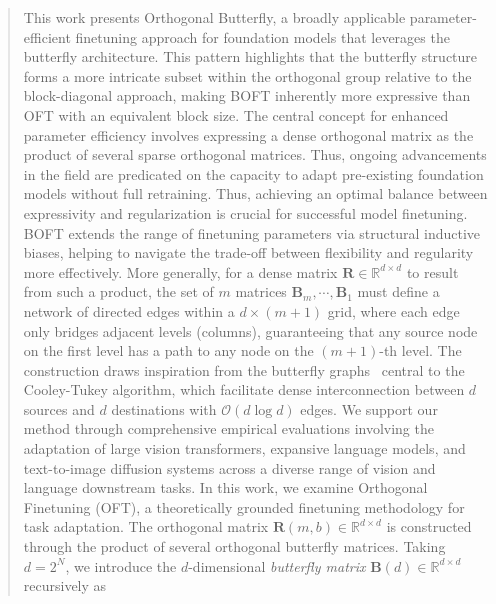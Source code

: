 \begin{itemize}[leftmargin=*,nosep]
\begin{theorem}
\begin{abstract}
This work presents Orthogonal Butterfly, a broadly applicable parameter-efficient finetuning approach for foundation models that leverages the butterfly architecture. This pattern highlights that the butterfly structure forms a more intricate subset within the orthogonal group relative to the block-diagonal approach, making BOFT inherently more expressive than OFT with an equivalent block size. The central concept for enhanced parameter efficiency involves expressing a dense orthogonal matrix as the product of several sparse orthogonal matrices. Thus, ongoing advancements in the field are predicated on the capacity to adapt pre-existing foundation models without full retraining. Thus, achieving an optimal balance between expressivity and regularization is crucial for successful model finetuning. BOFT extends the range of finetuning parameters via structural inductive biases, helping to navigate the trade-off between flexibility and regularity more effectively. More generally, for a dense matrix $\bm{R}\in\mathbb{R}^{d\times d}$ to result from such a product, the set of $m$ matrices $\bm{B}_m,\cdots,\bm{B}_1$ must define a network of directed edges within a $d\times (m+1)$ grid, where each edge only bridges adjacent levels (columns), guaranteeing that any source node on the first level has a path to any node on the $(m+1)$-th level. The construction draws inspiration from the butterfly graphs~\cite{cooley1965algorithm} central to the Cooley-Tukey algorithm, which facilitate dense interconnection between $d$ sources and $d$ destinations with $\mathcal{O}(d\log d)$ edges. We support our method through comprehensive empirical evaluations involving the adaptation of large vision transformers, expansive language models, and text-to-image diffusion systems across a diverse range of vision and language downstream tasks. In this work, we examine Orthogonal Finetuning (OFT), a theoretically grounded finetuning methodology for task adaptation. The orthogonal matrix $\bm{R}(m, b)\in\mathbb{R}^{d\times d}$ is constructed through the product of several orthogonal butterfly matrices. Taking $d=2^N$, we introduce the $d$-dimensional \emph{butterfly matrix} $\bm{B}(d)\in\mathbb{R}^{d\times d}$ recursively as


\end{abstract}
\end{theorem}
\end{itemize}
